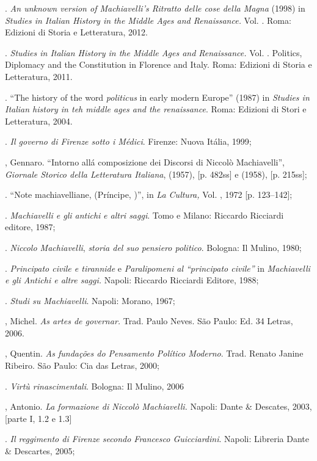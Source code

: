 \begin{bibliohedra}
\titidem. \emph{An unknown version of Machiavelli's Ritratto
delle cose della Magna} (1998) in \emph{Studies in Italian History in
the Middle Ages and Renaissance.} Vol. . Roma: Edizioni di Storia e
Letteratura, 2012.

\titidem. \emph{Studies in Italian History in the Middle Ages
and Renaissance.} Vol. . Politics, Diplomacy and the Constitution in
Florence and Italy. Roma: Edizioni di Storia e Letteratura, 2011.

\titidem. ``The history of the word \emph{politicus} in early
modern Europe'' (1987) in \emph{Studies in Italian history in teh middle
ages and the renaissance}. Roma: Edizioni di Stori e Letteratura, 2004.

\titidem. \emph{Il governo di Firenze sotto i Médici}.
Firenze: Nuova Itália, 1999;

, Gennaro. ``Intorno allá composizione dei Discorsi di Niccolò
Machiavelli'', \emph{Giornale Storico della Letteratura Italiana},
 (1957), {[}p. 482ss{]} e  (1958), {[}p. 215ss{]};

\titidem. ``Note machiavelliane,  (Príncipe, )'', in \emph{La
Cultura,} Vol. , 1972 {[}p. 123--142{]};

\titidem. \emph{Machiavelli e gli antichi} \emph{e altri saggi}.
Tomo  e  Milano: Riccardo Ricciardi editore, 1987;

\titidem. \emph{Niccolo Machiavelli}, \emph{storia del suo
pensiero politico}. Bologna: Il Mulino, 1980;

\titidem. \emph{Principato civile e tirannide} e
\emph{Paralipomeni al ``principato civile''} in \emph{Machiavelli e gli
Antichi e altre saggi.} Napoli: Riccardo Ricciardi Editore, 1988;

\titidem. \emph{Studi su Machiavelli}. Napoli: Morano, 1967;

, Michel. \emph{As artes de governar.} Trad. Paulo Neves. São
Paulo: Ed. 34 Letras, 2006.

, Quentin. \emph{As fundações do Pensamento Político Moderno}.
Trad. Renato Janine Ribeiro. São Paulo: Cia das Letras, 2000;

\titidem. \emph{Virtù rinascimentali}. Bologna: Il Mulino, 2006

, Antonio. \emph{La formazione di Niccolò Machiavelli.} Napoli: Dante \&
Descates, 2003, {[}parte I, 1.2 e 1.3{]}

\titidem. \emph{Il reggimento di Firenze secondo Francesco
Guicciardini}. Napoli: Libreria Dante \& Descartes, 2005;


\end{bibliohedra}
